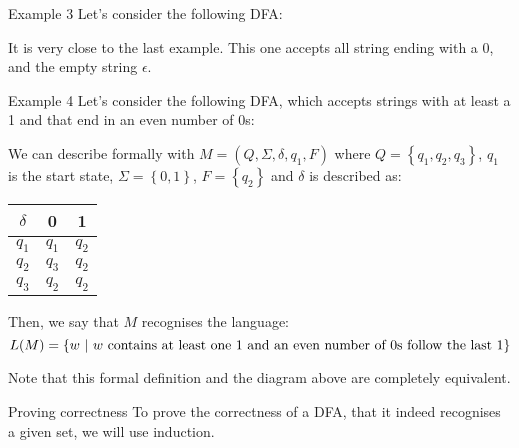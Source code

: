 \documentclass[a4paper]{article}
\begin{document}
\begin{parag}{Example 3}
    Let's consider the following DFA:

    It is very close to the last example. This one accepts all string ending with a 0, and the empty string $\epsilon$.
\end{parag}

\begin{parag}{Example 4}
    Let's consider the following DFA, which accepts strings with at least a 1 and that end in an even number of 0s:

    We can describe formally with $M = \left(Q, \Sigma, \delta, q_1, F\right)$ where $Q = \left\{q_1, q_2, q_3\right\}$, $q_1$ is the start state, $\Sigma= \left\{0, 1\right\}$, $F = \left\{q_2\right\}$ and $\delta$ is described as:
    \begin{center}
    \begin{tabular}{c|cc}
        $\delta$ & 0 & 1 \\
        \hline
        $q_1$ & $q_1$ & $q_2$ \\
        $q_2$ & $q_3$ & $q_2$ \\
        $q_3$ & $q_2$ & $q_2$
    \end{tabular}
    \end{center}

    Then, we say that $M$ recognises the language:
    \[L\left(M\right) = \left\{w \suchthat \text{$w$ contains at least one 1 and an even number of 0s follow the last 1}\right\}\]
    
    Note that this formal definition and the diagram above are completely equivalent.
\end{parag}

\begin{parag}{Proving correctness}
    To prove the correctness of a DFA, that it indeed recognises a given set, we will use induction.
\end{parag}
\end{document}

